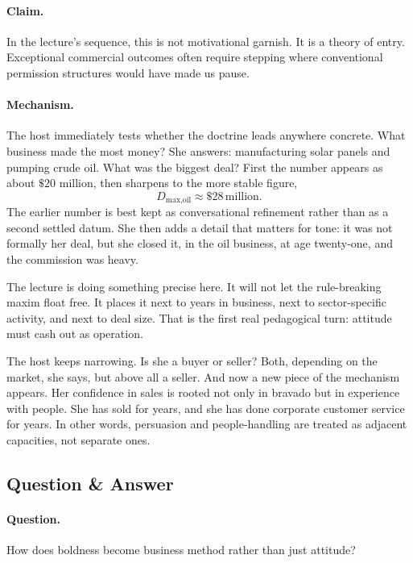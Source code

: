 \paragraph{Claim.}
In the lecture's sequence, this is not motivational garnish. It is a theory of entry. Exceptional commercial outcomes often require stepping where conventional permission structures would have made us pause.

\paragraph{Mechanism.}
The host immediately tests whether the doctrine leads anywhere concrete. What business made the most money? She answers: manufacturing solar panels and pumping crude oil. What was the biggest deal? First the number appears as about \(\$20\) million, then sharpens to the more stable figure,
\begin{equation}
D_{\text{max,oil}} \approx \$28\,\text{million}.
\end{equation}
The earlier number is best kept as conversational refinement rather than as a second settled datum. She then adds a detail that matters for tone: it was not formally her deal, but she closed it, in the oil business, at age twenty-one, and the commission was heavy.

The lecture is doing something precise here. It will not let the rule-breaking maxim float free. It places it next to years in business, next to sector-specific activity, and next to deal size. That is the first real pedagogical turn: attitude must cash out as operation.

The host keeps narrowing. Is she a buyer or seller? Both, depending on the market, she says, but above all a seller. And now a new piece of the mechanism appears. Her confidence in sales is rooted not only in bravado but in experience with people. She has sold for years, and she has done corporate customer service for years. In other words, persuasion and people-handling are treated as adjacent capacities, not separate ones.

\subsection{Question \& Answer}

\paragraph{Question.}
How does boldness become business method rather than just attitude?

